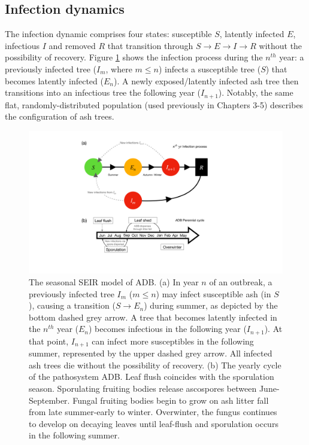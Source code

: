 \subsection{Infection dynamics}
\label{sec:infection-dynamics}

The infection dynamic comprises four states: susceptible $S$, latently infected $E$, infectious $I$ and removed $R$ that transition through $S\rightarrow E \rightarrow I \rightarrow R$ without the possibility of recovery.  
Figure \ref{fig:SEIR-transitions} shows the infection process during the $n^{th}$ year: a previously infected tree ($I_m$, where $m\leq n$) infects a susceptible tree ($S$) that becomes latently infected ($E_n$). A newly exposed/latently infected ash tree then transitions into an infectious tree the following year ($I_{n+1}$). Notably, the same flat, randomly-distributed population (used previously in Chapters 3-5) describes the configuration of ash trees.

\begin{figure}
    \centering
    \includegraphics[scale=0.40]{chapter6/figures/fig1-seir-transitions.pdf}
    \caption{The seasonal SEIR model of ADB. (a) In year $n$ of an outbreak, a previously infected tree $I_m$ ($m\leq n$) may infect susceptible ash (in $S$), causing a transition ($S\rightarrow E_n$) during summer, as  depicted by the bottom dashed grey arrow. A tree that becomes latently infected in the $n^{th}$ year ($E_n$) becomes infectious in the following year ($I_{n+1}$). At that point, $I_{n+1}$ can infect more susceptibles in the following summer, represented by the upper dashed grey arrow. All infected ash trees die without the possibility of recovery. (b) The yearly cycle of the pathosystem ADB. Leaf flush coincides with the sporulation season. Sporulating fruiting bodies release ascospores between June-September. Fungal fruiting bodies begin to grow on ash litter fall from late summer-early to winter. Overwinter, the fungus continues to develop on decaying leaves until leaf-flush and sporulation occurs in the following summer.}
    \label{fig:SEIR-transitions}
\end{figure}

